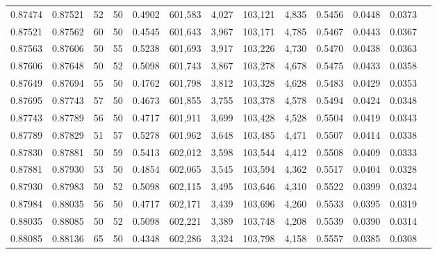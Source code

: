 \begin{tabular}{rrrrrrrrrrrrr}
0.87474 & 0.87521 &    52 &  50 &                                     0.4902 & 601,583 &   4,027 & 103,121 &   4,835 & 0.5456 & 0.0448 & 0.0373 \\
0.87521 & 0.87562 &    60 &  50 &                                     0.4545 & 601,643 &   3,967 & 103,171 &   4,785 & 0.5467 & 0.0443 & 0.0367 \\
0.87563 & 0.87606 &    50 &  55 &                                     0.5238 & 601,693 &   3,917 & 103,226 &   4,730 & 0.5470 & 0.0438 & 0.0363 \\
0.87606 & 0.87648 &    50 &  52 &                                     0.5098 & 601,743 &   3,867 & 103,278 &   4,678 & 0.5475 & 0.0433 & 0.0358 \\
0.87649 & 0.87694 &    55 &  50 &                                     0.4762 & 601,798 &   3,812 & 103,328 &   4,628 & 0.5483 & 0.0429 & 0.0353 \\
0.87695 & 0.87743 &    57 &  50 &                                     0.4673 & 601,855 &   3,755 & 103,378 &   4,578 & 0.5494 & 0.0424 & 0.0348 \\
0.87743 & 0.87789 &    56 &  50 &                                     0.4717 & 601,911 &   3,699 & 103,428 &   4,528 & 0.5504 & 0.0419 & 0.0343 \\
0.87789 & 0.87829 &    51 &  57 &                                     0.5278 & 601,962 &   3,648 & 103,485 &   4,471 & 0.5507 & 0.0414 & 0.0338 \\
0.87830 & 0.87881 &    50 &  59 &                                     0.5413 & 602,012 &   3,598 & 103,544 &   4,412 & 0.5508 & 0.0409 & 0.0333 \\
0.87881 & 0.87930 &    53 &  50 &                                     0.4854 & 602,065 &   3,545 & 103,594 &   4,362 & 0.5517 & 0.0404 & 0.0328 \\
0.87930 & 0.87983 &    50 &  52 &                                     0.5098 & 602,115 &   3,495 & 103,646 &   4,310 & 0.5522 & 0.0399 & 0.0324 \\
0.87984 & 0.88035 &    56 &  50 &                                     0.4717 & 602,171 &   3,439 & 103,696 &   4,260 & 0.5533 & 0.0395 & 0.0319 \\
0.88035 & 0.88085 &    50 &  52 &                                     0.5098 & 602,221 &   3,389 & 103,748 &   4,208 & 0.5539 & 0.0390 & 0.0314 \\
0.88085 & 0.88136 &    65 &  50 &                                     0.4348 & 602,286 &   3,324 & 103,798 &   4,158 & 0.5557 & 0.0385 & 0.0308 \\

\end{tabular}
